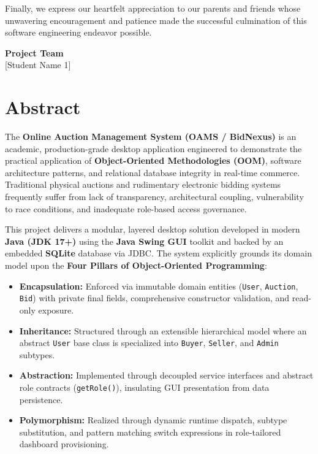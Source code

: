 \documentclass[12pt,a4paper]{article}
\begin{document}
Finally, we express our heartfelt appreciation to our parents and friends whose unwavering encouragement and patience made the successful culmination of this software engineering endeavor possible.

\vspace{1.5cm}
\begin{flushright}
\textbf{Project Team}\\[0.1cm]
[Student Name 1]  
\end{flushright}

\newpage

\section*{Abstract}
\vspace{0.8cm}

The \textbf{Online Auction Management System (OAMS / BidNexus)} is an academic, production-grade desktop application engineered to demonstrate the practical application of \textbf{Object-Oriented Methodologies (OOM)}, software architecture patterns, and relational database integrity in real-time commerce. Traditional physical auctions and rudimentary electronic bidding systems frequently suffer from lack of transparency, architectural coupling, vulnerability to race conditions, and inadequate role-based access governance.

This project delivers a modular, layered desktop solution developed in modern \textbf{Java (JDK 17+)} using the \textbf{Java Swing GUI} toolkit and backed by an embedded \textbf{SQLite} database via JDBC. The system explicitly grounds its domain model upon the \textbf{Four Pillars of Object-Oriented Programming}:
\begin{itemize}[noitemsep]
    \item \textbf{Encapsulation:} Enforced via immutable domain entities (\texttt{User}, \texttt{Auction}, \texttt{Bid}) with private final fields, comprehensive constructor validation, and read-only exposure.
    \item \textbf{Inheritance:} Structured through an extensible hierarchical model where an abstract \texttt{User} base class is specialized into \texttt{Buyer}, \texttt{Seller}, and \texttt{Admin} subtypes.
    \item \textbf{Abstraction:} Implemented through decoupled service interfaces and abstract role contracts (\texttt{getRole()}), insulating GUI presentation from data persistence.
    \item \textbf{Polymorphism:} Realized through dynamic runtime dispatch, subtype substitution, and pattern matching switch expressions in role-tailored dashboard provisioning.
\end{itemize}
\end{document}

